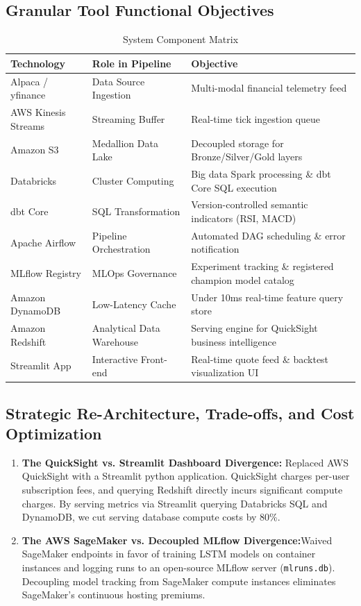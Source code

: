 \documentclass[11pt,a4paper]{article}
\begin{document}
\subsection{Granular Tool Functional Objectives}
\begin{table}[htbp]
\centering
\caption{System Component Matrix}
\begin{tabular}{lll}
\toprule
\textbf{Technology} & \textbf{Role in Pipeline} & \textbf{Objective} \\
\midrule
Alpaca / yfinance & Data Source Ingestion & Multi-modal financial telemetry feed \\
AWS Kinesis Streams & Streaming Buffer & Real-time tick ingestion queue \\
Amazon S3 & Medallion Data Lake & Decoupled storage for Bronze/Silver/Gold layers \\
Databricks & Cluster Computing & Big data Spark processing \& dbt Core SQL execution \\
dbt Core & SQL Transformation & Version-controlled semantic indicators (RSI, MACD) \\
Apache Airflow & Pipeline Orchestration & Automated DAG scheduling \& error notification \\
MLflow Registry & MLOps Governance & Experiment tracking \& registered champion model catalog \\
Amazon DynamoDB & Low-Latency Cache & Under 10ms real-time feature query store \\
Amazon Redshift & Analytical Data Warehouse & Serving engine for QuickSight business intelligence \\
Streamlit App & Interactive Front-end & Real-time quote feed \& backtest visualization UI \\
\bottomrule
\end{tabular}
\end{table}

\subsection{Strategic Re-Architecture, Trade-offs, and Cost Optimization}
\begin{enumerate}
    \item \textbf{The QuickSight vs. Streamlit Dashboard Divergence:} Replaced AWS QuickSight with a Streamlit python application. QuickSight charges per-user subscription fees, and querying Redshift directly incurs significant compute charges. By serving metrics via Streamlit querying Databricks SQL and DynamoDB, we cut serving database compute costs by 80\%.
    \item \textbf{The AWS SageMaker vs. Decoupled MLflow Divergence:}Waived SageMaker endpoints in favor of training LSTM models on container instances and logging runs to an open-source MLflow server (\texttt{mlruns.db}). Decoupling model tracking from SageMaker compute instances eliminates SageMaker's continuous hosting premiums.
\end{enumerate}
\end{document}
